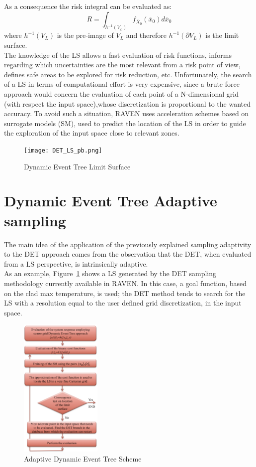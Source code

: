 \documentclass{anstrans}
\begin{document}
As a consequence the risk integral can be evaluated as:
\begin{equation}
R=\int_{h^{-1}(V_{L})} f _{\overline{X}_{0}}(\overline{x}_{0})d\overline{x}_{0}
\end{equation}
where $h^{-1}(V_{L})$ is the pre-image of $V_{L}$ and therefore $h^{-1}(\partial V_{L})$ is the limit surface.
\\
The knowledge of the LS allows a fast evaluation of risk functions, informs regarding which uncertainties are the most relevant from a risk point of view, defines safe areas to be explored for risk reduction, etc. Unfortunately, the search of a LS in terms of computational effort is very expensive, since a brute force approach would concern the evaluation of each point of a N-dimensional grid (with respect the input space),whose discretization is proportional to the wanted accuracy.
To avoid such a situation, RAVEN uses acceleration schemes based on surrogate models (SM), used to predict the location of the LS in order to guide the exploration of the input space close to relevant zones.

\begin{figure}
  \centering
     \texttt{[image: DET\_LS\_pb.png]}
  \caption{Dynamic Event Tree Limit Surface}
  \label{fig:LSDET}
\end{figure}

\section{Dynamic Event Tree Adaptive sampling}
The main idea of the application of the previously explained sampling adaptivity to the DET approach comes from the observation that the DET, when evaluated from a LS perspective, is intrinsically adaptive.
\\ As an example, Figure~\ref{fig:LSDET}  shows a LS generated by the DET sampling methodology currently available in RAVEN. In this case, a goal function, based on the clad max temperature, is used; the DET method tends to search for the LS with a resolution equal to the user defined grid discretization, in the input space.
\begin{figure}
  \centering
     \includegraphics[width=0.35\textwidth]{AdaptiveDET.png}
  \caption{Adaptive Dynamic Event Tree Scheme}
  \label{fig:AdaptiveDET}
\end{figure}
\end{document}
